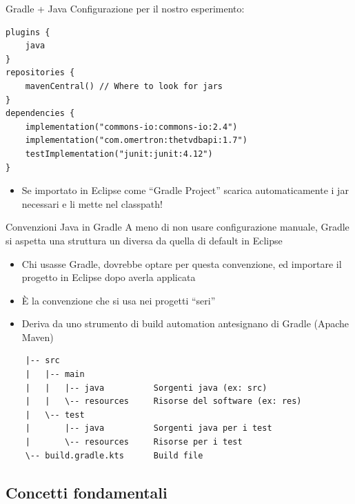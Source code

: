 \documentclass[presentation]{beamer}
\begin{document}
\begin{frame}[fragile]{Gradle + Java}
Configurazione per il nostro esperimento:
\begin{block}{}
\begin{verbatim}
plugins {
    java
}
repositories {
    mavenCentral() // Where to look for jars
}
dependencies {
    implementation("commons-io:commons-io:2.4")
    implementation("com.omertron:thetvdbapi:1.7")
    testImplementation("junit:junit:4.12")
}
\end{verbatim}
\end{block}
\begin{itemize}
    \item Se importato in Eclipse come ``Gradle Project'' scarica automaticamente i jar necessari e li mette nel classpath!
\end{itemize}
\end{frame}

\begin{frame}[fragile]{Convenzioni Java in Gradle}
    A meno di non usare configurazione manuale, Gradle si aspetta una struttura un diversa da quella di default in Eclipse
    \begin{itemize}
        \item Chi usasse Gradle, dovrebbe optare per questa convenzione, ed importare il progetto in Eclipse dopo averla applicata
        \item È la convenzione che si usa nei progetti ``seri''
        \item Deriva da uno strumento di build automation antesignano di Gradle (Apache Maven)
    \end{itemize}
    \begin{verbatim}
    |-- src
    |   |-- main
    |   |   |-- java          Sorgenti java (ex: src)
    |   |   \-- resources     Risorse del software (ex: res)
    |   \-- test
    |       |-- java          Sorgenti java per i test
    |       \-- resources     Risorse per i test
    \-- build.gradle.kts      Build file
    \end{verbatim}
\end{frame}

\subsection{Concetti fondamentali}
\end{document}
